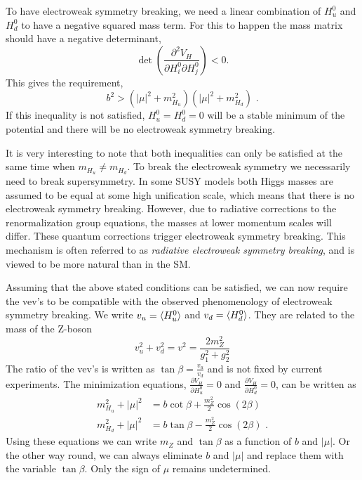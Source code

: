 To have electroweak symmetry breaking, we need a linear combination of $H_u^0$ and $H_d^0$ to have a
negative squared mass term. For this to happen the mass matrix should have a negative determinant,
\begin{equation}
  \det{\left( \frac{\partial^2 V_H}{\partial H_i^0 \partial H_j^0} \right)} < 0 .
\end{equation}
This gives the requirement,
\begin{equation}
  b^2 > \left( |\mu|^2 + m_{H_u}^2 \right) \left( |\mu|^2 + m_{H_d}^2 \right) \textrm{ .}
\end{equation}
If this inequality is not satisfied, $H_u^0 = H_d^0 = 0$ will be a stable minimum of the potential
and there will be no electroweak symmetry breaking. 

It is very interesting to note that both inequalities can only be satisfied at the same time when
$m_{H_u} \neq m_{H_d}$. To break the electroweak symmetry we necessarily need to break
supersymmetry. 
In some SUSY models both Higgs masses are assumed to be equal at some high unification scale, which
means that there is no electroweak symmetry breaking. However, due to radiative corrections to the
renormalization group equations, the masses at lower momentum scales will differ.
These quantum corrections trigger electroweak symmetry breaking. This mechanism is often referred
to as \textit{radiative electroweak symmetry breaking}, and is viewed to be more natural than in
the SM. 

Assuming that the above stated conditions can be satisfied, we can now require the vev's to be
compatible with the observed phenomenology of electroweak symmetry breaking. We write $v_u =
\braket{H_u^0}$ and $v_d = \braket{H_d^0}$. They are related to the mass of the Z-boson
\begin{equation}
  v_u^2 + v_d^2 = v^2 = \frac{2 m_Z^2}{g_1^2 + g_2^2} 
\end{equation}
The ratio of the vev's is written as $\tan\beta = \frac{v_u}{v_d}$ and is not fixed by current
experiments. The minimization equations, $\frac{\partial V_H}{\partial H_u^0} = 0$ and 
$\frac{\partial V_H}{\partial H_d^0} = 0$, can be written as
\begin{align}
  m_{H_u}^2 + |\mu|^2 &= b\cot\beta + \frac{m_Z^2}{2}\cos(2\beta) \\
  m_{H_d}^2 + |\mu|^2 &= b\tan\beta - \frac{m_Z^2}{2}\cos(2\beta) \textrm{ .}
\end{align}
Using these equations we can write $m_Z$ and $\tan\beta$ as a function of $b$ and $|\mu|$. Or the
other way round, we can always eliminate $b$ and $|\mu|$ and replace them with the variable
$\tan\beta$. Only the sign of $\mu$ remains undetermined. 


